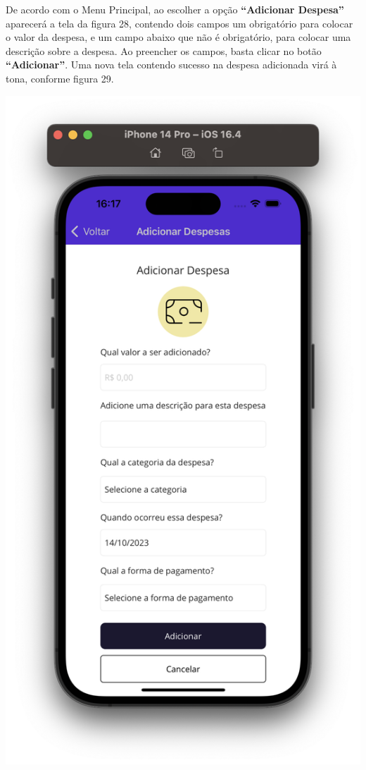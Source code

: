 De acordo com o Menu Principal, ao escolher a opção \textbf{“Adicionar Despesa”} aparecerá a tela da figura 28, contendo dois campos um obrigatório para colocar o valor da despesa, e um campo abaixo que não é obrigatório, para colocar uma descrição sobre a despesa. Ao preencher os campos, basta clicar no botão \textbf{“Adicionar”}. Uma nova tela contendo sucesso na despesa adicionada virá à tona, conforme figura 29.

    \vspace{\baselineskip}
    \begin{center}
        \begin{minipage}{0.4\textwidth}
            \centering
            \includegraphics[scale=0.2]{figs/figura28.png}

\end{minipage}
\end{center}
